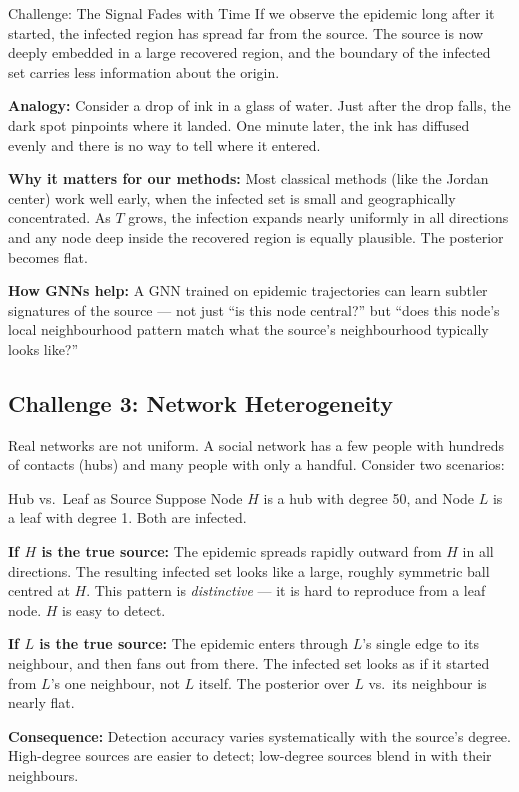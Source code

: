 \begin{conceptbox}{Challenge: The Signal Fades with Time}
If we observe the epidemic long after it started, the infected region has
spread far from the source. The source is now deeply embedded in a large
recovered region, and the boundary of the infected set carries less
information about the origin.

\textbf{Analogy:} Consider a drop of ink in a glass of water. Just after the
drop falls, the dark spot pinpoints where it landed. One minute later, the
ink has diffused evenly and there is no way to tell where it entered.

\textbf{Why it matters for our methods:} Most classical methods (like the
Jordan center) work well early, when the infected set is small and
geographically concentrated. As $T$ grows, the infection expands nearly
uniformly in all directions and any node deep inside the recovered region is
equally plausible. The posterior becomes flat.

\textbf{How GNNs help:} A GNN trained on epidemic trajectories can learn
subtler signatures of the source — not just ``is this node central?'' but
``does this node's local neighbourhood pattern match what the source's
neighbourhood typically looks like?''
\end{conceptbox}

\subsection{Challenge 3: Network Heterogeneity}

Real networks are not uniform. A social network has a few people with
hundreds of contacts (hubs) and many people with only a handful. Consider
two scenarios:

\begin{examplebox}{Hub vs.\ Leaf as Source}
Suppose Node $H$ is a hub with degree 50, and Node $L$ is a leaf with
degree 1. Both are infected.

\textbf{If $H$ is the true source:} The epidemic spreads rapidly outward from
$H$ in all directions. The resulting infected set looks like a large,
roughly symmetric ball centred at $H$. This pattern is \emph{distinctive} —
it is hard to reproduce from a leaf node. $H$ is easy to detect.

\textbf{If $L$ is the true source:} The epidemic enters through $L$'s single
edge to its neighbour, and then fans out from there. The infected set looks
as if it started from $L$'s one neighbour, not $L$ itself. The posterior
over $L$ vs.\ its neighbour is nearly flat.

\textbf{Consequence:} Detection accuracy varies systematically with the
source's degree. High-degree sources are easier to detect; low-degree
sources blend in with their neighbours.
\end{examplebox}

